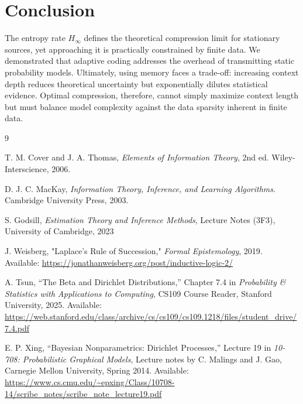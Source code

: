 \documentclass[11pt,a4paper]{article}
\theoremstyle{definition} %
\newcommand{\Hrate}{H_\infty}
\begin{document}
\section{Conclusion}

The entropy rate $\Hrate$ defines the theoretical compression limit for stationary sources, yet approaching it is practically constrained by finite data. We demonstrated that adaptive coding addresses the overhead of transmitting static probability models. Ultimately, using memory faces a trade-off: increasing context depth reduces theoretical uncertainty but exponentially dilutes statistical evidence. Optimal compression, therefore, cannot simply maximize context length but must balance model complexity against the data sparsity inherent in finite data.


\newpage

\begin{thebibliography}{9}

    T. M. Cover and J. A. Thomas, \textit{Elements of Information Theory}, 2nd ed. Wiley-Interscience, 2006.

    D. J. C. MacKay, \textit{Information Theory, Inference, and Learning Algorithms}. Cambridge University Press, 2003.

    S. Godsill, \textit{Estimation Theory and Inference Methods}, Lecture Notes (3F3), University of Cambridge, 2023

    J. Weisberg, "Laplace's Rule of Succession," \textit{Formal Epistemology}, 2019. Available: \url{https://jonathanweisberg.org/post/inductive-logic-2/}

    A. Tsun, ``The Beta and Dirichlet Distributions,'' Chapter 7.4 in \textit{Probability \& Statistics with Applications to Computing}, CS109 Course Reader, Stanford University, 2025. Available: \url{https://web.stanford.edu/class/archive/cs/cs109/cs109.1218/files/student_drive/7.4.pdf}

    E. P. Xing, ``Bayesian Nonparametrics: Dirichlet Processes,'' Lecture 19 in \textit{10-708: Probabilistic Graphical Models}, Lecture notes by C. Malings and J. Gao, Carnegie Mellon University, Spring 2014. Available: \url{https://www.cs.cmu.edu/~epxing/Class/10708-14/scribe_notes/scribe_note_lecture19.pdf}


\end{thebibliography}
\end{document}
